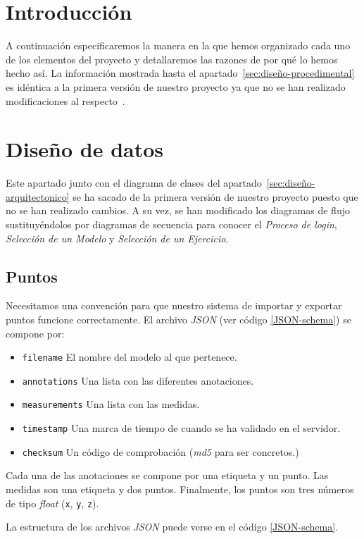 
\section{Introducción}
A continuación especificaremos la manera en la que hemos organizado cada uno de los elementos del proyecto y detallaremos las razones de por qué lo hemos hecho así. La información mostrada hasta el apartado~\ref{sec:diseño-procedimental} es idéntica a la primera versión de nuestro proyecto ya que no se han realizado modificaciones al respecto~\cite{github:alberto-viewer}.

\section{Diseño de datos}
Este apartado junto con el diagrama de clases del apartado~\ref{sec:diseño-arquitectonico} se ha sacado de la primera versión de nuestro proyecto puesto que no se han realizado cambios. A su vez, se han modificado los diagramas de flujo sustituyéndolos por diagramas de secuencia para conocer el \textit{Proceso de login}, \textit{Selección de un Modelo} y \textit{Selección de un Ejercicio}.

\subsection{Puntos}
Necesitamos una convención para que nuestro sistema de importar y exportar puntos funcione correctamente. El archivo \textit{JSON} (ver código \ref{JSON-schema}) se compone por:
\begin{itemize}
	\item \texttt{filename} El nombre del modelo al que pertenece.
	\item \texttt{annotations} Una lista con las diferentes anotaciones.
	\item \texttt{measurements} Una lista con las medidas.
	\item \texttt{timestamp} Una marca de tiempo de cuando se ha validado en el servidor.
	\item \texttt{checksum} Un código de comprobación (\textit{md5} para ser concretos.)
\end{itemize}
Cada una de las anotaciones se compone por una etiqueta y un punto. Las medidas son una etiqueta y dos puntos. Finalmente, los puntos son tres números de tipo \textit{float} (\texttt{x}, \texttt{y}, \texttt{z}).

La estructura de los archivos \textit{JSON} puede verse en el código \ref{JSON-schema}.

